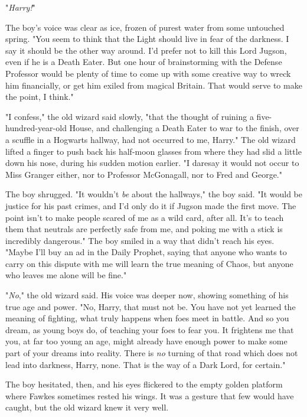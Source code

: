 "\emph{Harry!}"

The boy's voice was clear as ice, frozen of purest water from some untouched 
spring. "You seem to think that the Light should live in fear of the darkness. 
I say it should be the other way around. I'd prefer not to kill this Lord 
Jugson, even if he is a Death Eater. But one hour of brainstorming with the 
Defense Professor would be plenty of time to come up with some creative way to 
wreck him financially, or get him exiled from magical Britain. That would serve 
to make the point, I think."

"I confess," the old wizard said slowly, "that the thought of ruining a 
five-hundred-year-old House, and challenging a Death Eater to war to the 
finish, over a scuffle in a Hogwarts hallway, had not occurred to me, Harry." 
The old wizard lifted a finger to push back his half-moon glasses from where 
they had slid a little down his nose, during his sudden motion earlier. "I 
daresay it would not occur to Miss Granger either, nor to Professor McGonagall, 
nor to Fred and George."

The boy shrugged. "It wouldn't \emph{be} about the hallways," the boy said. "It 
would be justice for his past crimes, and I'd only do it if Jugson made the 
first move. The point isn't to make people scared of me as a wild card, after 
all. It's to teach them that neutrals are perfectly safe from me, and poking me 
with a stick is incredibly dangerous." The boy smiled in a way that didn't 
reach his eyes. "Maybe I'll buy an ad in the Daily Prophet, saying that anyone 
who wants to carry on this dispute with me will learn the true meaning of 
Chaos, but anyone who leaves me alone will be fine."

"\emph{No}," the old wizard said. His voice was deeper now, showing something 
of his true age and power. "No, Harry, that must not be. You have not yet 
learned the meaning of fighting, what truly happens when foes meet in battle. 
And so you dream, as young boys do, of teaching your foes to fear you. It 
frightens me that you, at far too young an age, might already have enough power 
to make some part of your dreams into reality. There is \emph{no} turning of 
that road which does not lead into darkness, Harry, none. That is the way of a 
Dark Lord, for certain."

The boy hesitated, then, and his eyes flickered to the empty golden platform 
where Fawkes sometimes rested his wings. It was a gesture that few would have 
caught, but the old wizard knew it very well.

